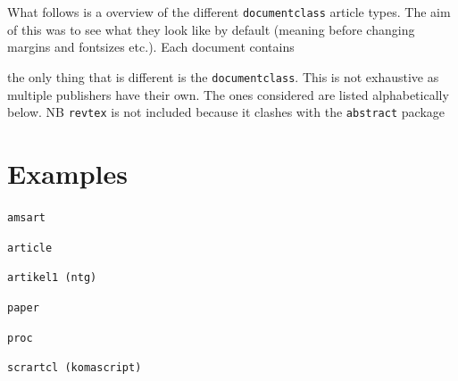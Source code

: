 \documentclass[DIV=16, 11pt]{scrartcl}
\begin{document}
What follows is a overview of the different \texttt{documentclass} article types. The aim of this was to see what they look like by default (meaning before changing margins and fontsizes etc.). Each document contains

the only thing that is different is the \texttt{documentclass}. This is not exhaustive as multiple publishers have their own. The ones considered are listed alphabetically below. NB \texttt{revtex} is not included because it clashes with the \texttt{abstract} package

\section*{Examples}

\begin{multicols}{2}
\vbox{\texttt{amsart}~\\
}

\vbox{\texttt{article}~\\
}

\vbox{\texttt{artikel1 (ntg)}~\\
}

\vbox{\texttt{paper}~\\
}

\vbox{\texttt{proc}~\\
}

\vbox{\texttt{scrartcl (komascript)}~\\
}
\end{multicols}
\end{document}
